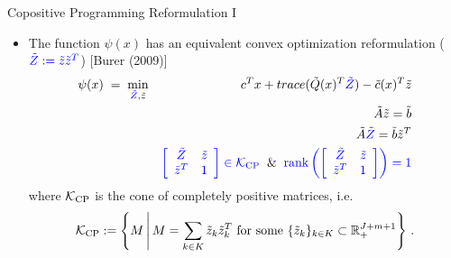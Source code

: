\documentclass[xcolor=x11names,compress]{beamer}
\renewcommand{\(}{\begin{columns}}
\renewcommand{\)}{\end{columns}}
\newcommand{\<}[1]{\begin{column}{#1}}
\renewcommand{\>}{\end{column}}
\def\min{\mathop{\rm min}}
\newcommand{\0}{\V{0}}
\newcommand{\1}{\V{1}}
\newcommand{\mymbox}[1]{\mbox{\scriptsize #1}}
\renewcommand{\Re}{\mathbb{R}}
\newcommand{\trace}{\mathop{trace}}
\newcommand{\tQ}{\tilde{Q}(x)}
\newcommand{\tq}{\tilde{c}(x)}
\newcommand{\tA}{\tilde{A}}
\newcommand{\tb}{\tilde{b}}
\newcommand{\ty}{\tilde{z}}
\newcommand{\tY}{\tilde{Z}}
\newcommand{\copconeCompPos}{\mathcal{K}_{\mymbox{CP}}}
\begin{document}
\begin{frame}{Copositive Programming Reformulation I}
\begin{itemize}
\item The function $\psi(x)$ has an equivalent convex optimization reformulation (${\color{blue} \tY := \ty\ty^T}$) {\footnotesize [Burer (2009)]}
\begin{eqnarray*}
\psi(x) \;=\;\min_{{\color{blue} \tY},\ty} &&c^Tx+ \trace(\tQ^T {\color{blue} \tY})-\tq^T\ty\\
&&\tA \ty= \tb\\
&&\tA {\color{blue} \tY}= \tb\ty^T\\
&& {\color{blue} \left[\begin{array}{cc} \tY & \ty\\ \ty^T & 1\end{array}\right] \in \copconeCompPos} \;\;\&\;\;{\color{blue} \mbox{rank}\left( \left[\begin{array}{cc} \tY & \ty\\ \ty^T & 1\end{array}\right]\right)=1}
\end{eqnarray*}
where  $\copconeCompPos$ is the cone of completely positive matrices, i.e.
\[\copconeCompPos := \left\{ M  \,\middle|\, M = \sum_{k\in K} \ty_k \ty_k^T \mbox{ for some } \{ \ty_k \}_{k\in K}\subset \Re_+^{J+m+1} \right\}\,.\]
\end{itemize}
\end{frame}
\end{document}
